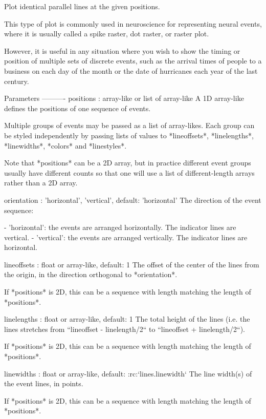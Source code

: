 \begin{DoxyVerb}Plot identical parallel lines at the given positions.

This type of plot is commonly used in neuroscience for representing
neural events, where it is usually called a spike raster, dot raster,
or raster plot.

However, it is useful in any situation where you wish to show the
timing or position of multiple sets of discrete events, such as the
arrival times of people to a business on each day of the month or the
date of hurricanes each year of the last century.

Parameters
----------
positions : array-like or list of array-like
    A 1D array-like defines the positions of one sequence of events.

    Multiple groups of events may be passed as a list of array-likes.
    Each group can be styled independently by passing lists of values
    to *lineoffsets*, *linelengths*, *linewidths*, *colors* and
    *linestyles*.

    Note that *positions* can be a 2D array, but in practice different
    event groups usually have different counts so that one will use a
    list of different-length arrays rather than a 2D array.

orientation : {'horizontal', 'vertical'}, default: 'horizontal'
    The direction of the event sequence:

    - 'horizontal': the events are arranged horizontally.
      The indicator lines are vertical.
    - 'vertical': the events are arranged vertically.
      The indicator lines are horizontal.

lineoffsets : float or array-like, default: 1
    The offset of the center of the lines from the origin, in the
    direction orthogonal to *orientation*.

    If *positions* is 2D, this can be a sequence with length matching
    the length of *positions*.

linelengths : float or array-like, default: 1
    The total height of the lines (i.e. the lines stretches from
    ``lineoffset - linelength/2`` to ``lineoffset + linelength/2``).

    If *positions* is 2D, this can be a sequence with length matching
    the length of *positions*.

linewidths : float or array-like, default: :rc:`lines.linewidth`
    The line width(s) of the event lines, in points.

    If *positions* is 2D, this can be a sequence with length matching
    the length of *positions*.


\end{DoxyVerb}
